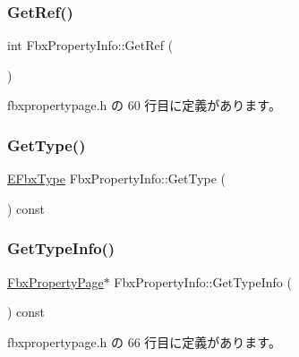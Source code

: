 \subsubsection{\texorpdfstring{Get\+Ref()}{GetRef()}}
{\footnotesize\ttfamily int Fbx\+Property\+Info\+::\+Get\+Ref (\begin{DoxyParamCaption}{ }\end{DoxyParamCaption})\hspace{0.3cm}{\ttfamily [inline]}}



 fbxpropertypage.\+h の 60 行目に定義があります。

\mbox{\label{class_fbx_property_info_adbe577ff5fe12e6f9a3a80b092e4c204}} 
\subsubsection{\texorpdfstring{Get\+Type()}{GetType()}}
{\footnotesize\ttfamily \hyperlink{fbxpropertytypes_8h_a73913a5ddfb20e57c6f25e9e6784bd92}{E\+Fbx\+Type} Fbx\+Property\+Info\+::\+Get\+Type (\begin{DoxyParamCaption}{ }\end{DoxyParamCaption}) const}

\mbox{\label{class_fbx_property_info_adef9c91ef693e2c4eb6a918c086f4789}} 
\subsubsection{\texorpdfstring{Get\+Type\+Info()}{GetTypeInfo()}}
{\footnotesize\ttfamily \hyperlink{class_fbx_property_page}{Fbx\+Property\+Page}$\ast$ Fbx\+Property\+Info\+::\+Get\+Type\+Info (\begin{DoxyParamCaption}{ }\end{DoxyParamCaption}) const\hspace{0.3cm}{\ttfamily [inline]}}



 fbxpropertypage.\+h の 66 行目に定義があります。

\mbox{\label{class_fbx_property_info_a477a09fa03362948cbb168663de05690}} 
